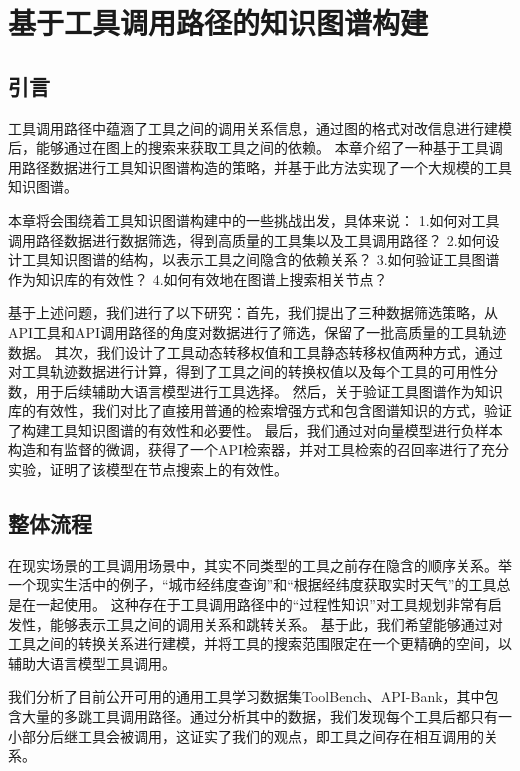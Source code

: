 
\chapter{基于工具调用路径的知识图谱构建}

\section{引言}

工具调用路径中蕴涵了工具之间的调用关系信息，通过图的格式对改信息进行建模后，能够通过在图上的搜索来获取工具之间的依赖。
本章介绍了一种基于工具调用路径数据进行工具知识图谱构造的策略，并基于此方法实现了一个大规模的工具知识图谱。

本章将会围绕着工具知识图谱构建中的一些挑战出发，具体来说：
1.如何对工具调用路径数据进行数据筛选，得到高质量的工具集以及工具调用路径？
2.如何设计工具知识图谱的结构，以表示工具之间隐含的依赖关系？
3.如何验证工具图谱作为知识库的有效性？
4.如何有效地在图谱上搜索相关节点？

基于上述问题，我们进行了以下研究：首先，我们提出了三种数据筛选策略，从API工具和API调用路径的角度对数据进行了筛选，保留了一批高质量的工具轨迹数据。
其次，我们设计了工具动态转移权值和工具静态转移权值两种方式，通过对工具轨迹数据进行计算，得到了工具之间的转换权值以及每个工具的可用性分数，用于后续辅助大语言模型进行工具选择。
然后，关于验证工具图谱作为知识库的有效性，我们对比了直接用普通的检索增强方式和包含图谱知识的方式，验证了构建工具知识图谱的有效性和必要性。
最后，我们通过对向量模型进行负样本构造和有监督的微调，获得了一个API检索器，并对工具检索的召回率进行了充分实验，证明了该模型在节点搜索上的有效性。

\section{整体流程}

在现实场景的工具调用场景中，其实不同类型的工具之前存在隐含的顺序关系。举一个现实生活中的例子，“城市经纬度查询”和“根据经纬度获取实时天气”的工具总是在一起使用。
这种存在于工具调用路径中的“过程性知识”对工具规划非常有启发性，能够表示工具之间的调用关系和跳转关系。
基于此，我们希望能够通过对工具之间的转换关系进行建模，并将工具的搜索范围限定在一个更精确的空间，以辅助大语言模型工具调用。

我们分析了目前公开可用的通用工具学习数据集ToolBench、API-Bank，其中包含大量的多跳工具调用路径。通过分析其中的数据，我们发现每个工具后都只有一小部分后继工具会被调用，这证实了我们的观点，即工具之间存在相互调用的关系。

